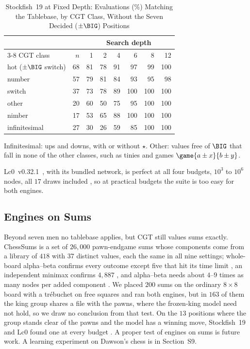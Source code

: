 \begin{table}[!t]
\centering
\caption{Stockfish~19 at Fixed Depth: Evaluations (\%) Matching the Tablebase, by CGT Class, Without the
Seven Decided ($\pm\BIG$) Positions}
\label{tab:sf}
\footnotesize
\begin{tabular}{@{}lrrrrrrr@{}}
\toprule
 & & \multicolumn{6}{c}{Search depth} \\
\cmidrule(l){3-8}
CGT class & $n$ & 1 & 2 & 4 & 6 & 8 & 12 \\
\midrule
hot ($\pm\BIG$ switch) & 68 & 81 & 78 & 91 & 97 & 99 & 100 \\
number & 57 & 79 & 81 & 84 & 93 & 95 & 98 \\
switch & 37 & 73 & 78 & 89 & 100 & 100 & 100 \\
other & 20 & 60 & 50 & 75 & 95 & 100 & 100 \\
nimber & 17 & 53 & 65 & 88 & 100 & 100 & 100 \\
infinitesimal & 27 & 30 & 26 & 59 & 85 & 100 & 100 \\
\bottomrule
\end{tabular}

\smallskip
\parbox{\columnwidth}{\footnotesize Infinitesimal: ups and downs, with or without $\star$. Other: values free of
$\BIG$ that fall in none of the other classes, such as tinies and games $\game{a\pm x}{b\pm y}$.}
\end{table}

Lc0~v0.32.1~\cite{Lc0}, with its bundled network, is perfect at all four budgets, $10^3$ to $10^6$ nodes,
all $17$ draws included , so at practical budgets the suite is too easy for both engines.

\subsection{Engines on Sums}

Beyond seven men no tablebase applies, but CGT still values sums exactly. ChessSums is a set of $26{,}000$
pawn-endgame sums whose components come from a library of $418$ with $37$ distinct values, each the same in all
nine settings; whole-board alpha--beta confirms every outcome except five that hit its time limit , an
independent minimax confirms $4{,}887$ , and alpha--beta needs about $4$--$9$ times as many nodes per
added component . We placed $200$ sums on the ordinary $8\times8$ board with a tr\'ebuchet on free
squares and ran both engines, but in $163$ of them the king group shares a file with the pawns, where the
frozen-king model need not hold, so we draw no conclusion from that test. On the $13$ positions where the group
stands clear of the pawns and the model has a winning move, Stockfish~19 and Lc0 found one at every budget . A
proper test of engines on sums is future work. A learning experiment on Dawson's chess is in Section~S9.

